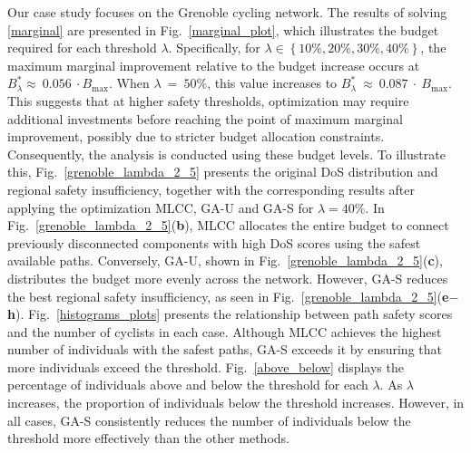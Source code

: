 \documentclass[letterpaper, 10 pt, conference]{ieeeconf}  %
\begin{document}
Our case study focuses on the Grenoble cycling network. The results of solving \eqref{marginal} are presented in Fig.~\ref{marginal_plot}, which illustrates the budget required for each threshold $\lambda$. Specifically, for $\lambda \in \left \{10\%,20\%,30\%,40\% \right \}$, the maximum marginal improvement relative to the budget increase occurs at $B_{\lambda}^{\ast} \approx~0.056~\cdot B_{\max}$. When $\lambda~=~50\%$, this value increases to $B_{\lambda}^{\ast}~\approx~0.087~\cdot~B_{\max}$. This suggests that at higher safety thresholds, optimization may require additional investments before reaching the point of maximum marginal improvement, possibly due to stricter budget allocation constraints. Consequently, the analysis is conducted using these budget levels. To illustrate this, Fig.~\ref{grenoble_lambda_2_5} presents the original DoS distribution and regional safety insufficiency, together with the corresponding results after applying the optimization MLCC, \mbox{GA-U} and \mbox{GA-S} for $\lambda=40\%$. In Fig.~\ref{grenoble_lambda_2_5}(\textbf{b}), MLCC allocates the entire budget to connect previously disconnected components with high DoS scores using the safest available paths. Conversely, \mbox{GA-U}, shown in Fig.~\ref{grenoble_lambda_2_5}(\textbf{c}), distributes the budget more evenly across the network. However, \mbox{GA-S} reduces the best regional safety insufficiency, as seen in Fig.~\ref{grenoble_lambda_2_5}(\textbf{e}$-$\textbf{h}).  Fig.~\ref{histograms_plots} presents the relationship between path safety scores and the number of cyclists in each case. Although MLCC achieves the highest number of individuals with the safest paths, \mbox{GA-S} exceeds it by ensuring that more individuals exceed the threshold. Fig.~\ref{above_below} displays the percentage of individuals above and below the threshold for each $\lambda$. As $\lambda$ increases, the proportion of individuals below the threshold increases. However, in all cases, \mbox{\mbox{GA-S}} consistently reduces the number of individuals below the threshold more effectively than the other methods.
\end{document}
